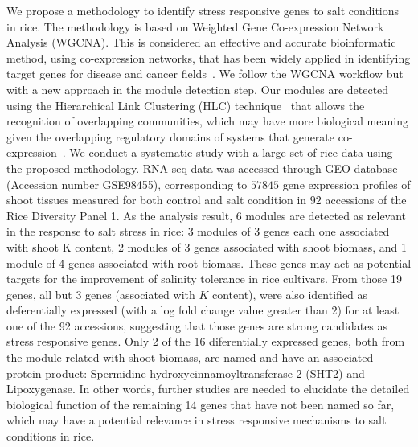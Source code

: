 \documentclass[12pt,journal, onecolumn]{IEEEtran}
\begin{document}
We propose a methodology to identify stress responsive genes to salt conditions in rice. The methodology is based on Weighted Gene Co-expression Network Analysis (WGCNA). This is considered an effective and accurate bioinformatic method, using co-expression networks, that has been widely applied in identifying target genes for disease and cancer fields~\cite{tian2018identifying}. We follow the WGCNA workflow but with a new approach in the module detection step. Our modules are detected using the Hierarchical Link Clustering (HLC) technique~\cite{ahn2010link} that allows the recognition of overlapping communities, which may have more biological meaning given the overlapping regulatory domains of systems that generate co-expression~\cite{gaiteri2014beyond}. We conduct a systematic study with a large set of rice data using the proposed methodology. RNA-seq data was accessed through GEO database~\cite{GEOAcces90:online} (Accession number GSE98455), corresponding to $57845$ gene expression profiles of shoot tissues measured for both control and salt condition in $92$ accessions of the Rice Diversity Panel 1. As the analysis result, 6 modules are detected as relevant in the response to salt stress in rice: 3 modules of 3 genes each one associated with shoot K content, 2 modules of 3 genes associated with  shoot biomass, and 1 module of 4 genes associated with root biomass. These genes may act as potential targets for the improvement of salinity tolerance in rice cultivars. From those 19 genes, all but 3 genes (associated with $K$ content), were also identified as deferentially expressed (with a log fold change value greater than $2$) for at least one of the 92 accessions, suggesting that those genes are strong candidates as stress responsive genes. Only 2 of the 16 diferentially expressed genes, both from the module related with shoot biomass, are named and have an associated protein product: Spermidine hydroxycinnamoyltransferase 2 (SHT2) and Lipoxygenase. In other words, further studies are needed to elucidate the detailed biological function of the remaining 14 genes that have not been named so far,  which may have a potential relevance in stress responsive mechanisms to salt conditions in rice.\\
\end{document}
